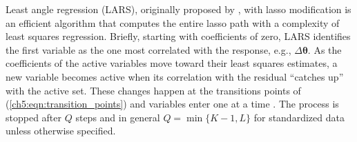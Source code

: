 Least angle regression (LARS), originally proposed by \cite{efron2004least}, with lasso modification is an efficient algorithm that computes the entire lasso path with a complexity of least squares regression. Briefly, starting with coefficients of zero, LARS identifies the first variable as the one most correlated with the response, e.g., $\Delta\boldsymbol{\theta}$. As the coefficients of the active variables move toward their least squares estimates, a new variable becomes active when its correlation with the residual ``catches up'' with the active set. These changes happen at the transitions points of (\ref{ch5:eqn:transition_points}) and variables enter one at a time \cite{efron2004least}. The process is stopped after $Q$ steps and in general $Q = \min\{K-1, L\}$ for standardized data unless otherwise specified. 

